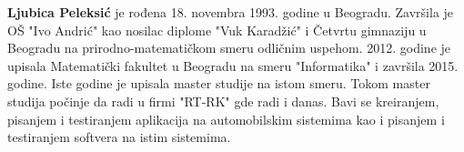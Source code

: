 \documentclass[12pt,oneside]{memoir}
\begin{document}
\begin{biografija}
  \textbf{Ljubica Peleksić} je rođena 18. novembra 1993. godine u Beogradu.  Završila je OŠ "Ivo Andrić" kao nosilac diplome "Vuk Karadžić" i Četvrtu gimnaziju u Beogradu na prirodno-matematičkom smeru odličnim uspehom.  2012. godine je upisala Matematički fakultet u Beogradu na smeru "Informatika" i završila 2015. godine.  Iste godine je upisala master studije na istom smeru.  Tokom master studija počinje da radi u firmi "RT-RK" gde radi i danas.  Bavi se kreiranjem,  pisanjem i testiranjem aplikacija na automobilskim sistemima kao i pisanjem i testiranjem softvera na istim sistemima.  
\end{biografija}
\end{document}
